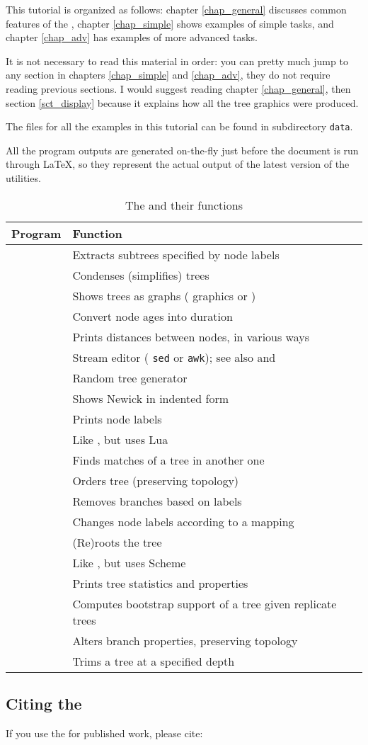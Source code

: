 This tutorial is organized as follows: chapter \ref{chap_general} discusses
common features of the \nutils, chapter \ref{chap_simple} shows examples of
simple tasks, and chapter \ref{chap_adv} has examples of more advanced tasks. 

It is not necessary to read this material in order: you can pretty much jump to
any section in chapters \ref{chap_simple} and \ref{chap_adv}, they do not
require reading previous sections. I would suggest reading chapter
\ref{chap_general}, then section \ref{sct_display} because it explains how all
the tree graphics were produced.

The files for all the examples in this tutorial can be found in
subdirectory \texttt{data}.

All the program outputs are generated on-the-fly just before the document is run
through \LaTeX{}, so they represent the actual output of the latest version of
the utilities.

\begin{table}[t]
\begin{tabular}{ll}
{\bf Program} & {\bf Function } \\
\hline
\clade		&	Extracts subtrees specified by node labels\\
\condense	&	Condenses (simplifies) trees \\
\display	&	Shows trees as graphs (\ascii{} graphics or \svg) \\
\duration	&	Convert node ages into duration \\
\distance	&	Prints distances between nodes, in various ways \\
\ed				&	Stream editor (\foreign{\`{a} la} \texttt{sed} or \texttt{awk}); see also \luaed{} and \sched \\
\gen			&	Random tree generator \\
\nwindent	&	Shows Newick in indented form \\ 
		&	Prints node labels \\
\luaed				&	Like \ed, but uses Lua\\
\match		&	Finds matches of a tree in another one \\
\order		&	Orders tree (preserving topology) \\
\prune		&	Removes branches based on labels \\ 
\rename		&	Changes node labels according to a mapping \\
\reroot		&	(Re)roots the tree \\
\sched				&	Like \luaed, but uses Scheme\\
\stats		&	Prints tree statistics and properties \\
\support	&	Computes bootstrap support of a tree given replicate trees \\
\topology	&	Alters branch properties, preserving topology \\
\trim		&	Trims a tree at a specified depth
\end{tabular}	
\caption{The \nutils{} and their functions}
\label{tbl_prog_list}
\end{table}

\subsection*{Citing the \nutils}

If you use the \nutils{} for published work, please cite:


